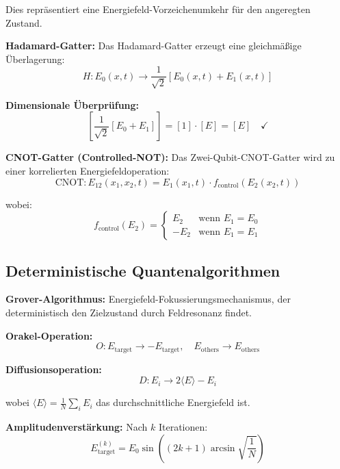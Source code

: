 \documentclass[12pt,a4paper]{report}
\begin{document}
	Dies repräsentiert eine Energiefeld-Vorzeichenumkehr für den angeregten Zustand.
	
	\textbf{Hadamard-Gatter:}
	Das Hadamard-Gatter erzeugt eine gleichmäßige Überlagerung:
	\begin{equation}
		H: E_0(x,t) \rightarrow \frac{1}{\sqrt{2}}[E_0(x,t) + E_1(x,t)]
	\end{equation}
	
	\textbf{Dimensionale Überprüfung:}
	\begin{equation}
		\left[\frac{1}{\sqrt{2}}[E_0 + E_1]\right] = [1] \cdot [E] = [E] \quad \checkmark
	\end{equation}
	
	\textbf{CNOT-Gatter (Controlled-NOT):}
	Das Zwei-Qubit-CNOT-Gatter wird zu einer korrelierten Energiefeldoperation:
	\begin{equation}
		\text{CNOT}: E_{12}(x_1,x_2,t) = E_1(x_1,t) \cdot f_{\text{control}}(E_2(x_2,t))
	\end{equation}
	
	wobei:
	\begin{equation}
		f_{\text{control}}(E_2) = \begin{cases}
			E_2 & \text{wenn } E_1 = E_0 \\
			-E_2 & \text{wenn } E_1 = E_1
		\end{cases}
	\end{equation}
	
	\subsection{Deterministische Quantenalgorithmen}
	\label{subsec:deterministic_algorithms}
	
	\textbf{Grover-Algorithmus:}
	Energiefeld-Fokussierungsmechanismus, der deterministisch den Zielzustand durch Feldresonanz findet.
	
	\textbf{Orakel-Operation:}
	\begin{equation}
		O: E_{\text{target}} \rightarrow -E_{\text{target}}, \quad E_{\text{others}} \rightarrow E_{\text{others}}
	\end{equation}
	
	\textbf{Diffusionsoperation:}
	\begin{equation}
		D: E_i \rightarrow 2\langle E \rangle - E_i
	\end{equation}
	
	wobei $\langle E \rangle = \frac{1}{N}\sum_i E_i$ das durchschnittliche Energiefeld ist.
	
	\textbf{Amplitudenverstärkung:}
	Nach $k$ Iterationen:
	\begin{equation}
		E_{\text{target}}^{(k)} = E_0 \sin\left((2k+1)\arcsin\sqrt{\frac{1}{N}}\right)
	\end{equation}
	
\end{document}
